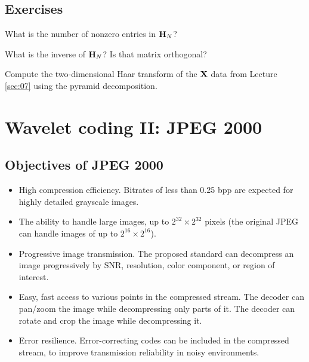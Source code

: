 \documentclass[a4paper, 11pt, openany]{book}
\begin{document}
\subsection{Exercises}

\begin{exercise}
What is the number of nonzero entries in ${\bf H}_N$?
\end{exercise}

\begin{exercise}
What is the inverse of ${\bf H}_N$? Is that matrix orthogonal?
\end{exercise}

\begin{exercise}
Compute the two-dimensional Haar transform of the ${\bf X}$ data from Lecture \ref{sec:07} using the pyramid decomposition.
\end{exercise}



\section{Wavelet coding II: JPEG 2000}
\label{sec:09}


\subsection{Objectives of JPEG 2000}

\begin{itemize}
    \item High compression efficiency. Bitrates of less than 0.25 bpp are expected for highly detailed grayscale images.

\item The ability to handle large images, up to $2^{32} \times 2^{32}$ pixels (the original JPEG can handle images of up to $2^{16} \times 2^{16}$).

\item Progressive image transmission. The proposed standard can decompress an image progressively by SNR, resolution, color component, or region of interest.

\item Easy, fast access to various points in the compressed stream.
The decoder can pan/zoom the image while decompressing only parts of it. The decoder can rotate and crop the image while decompressing it.

\item Error resilience. Error-correcting codes can be included in the compressed stream, to improve transmission reliability in noisy environments.
\end{itemize}
\end{document}
